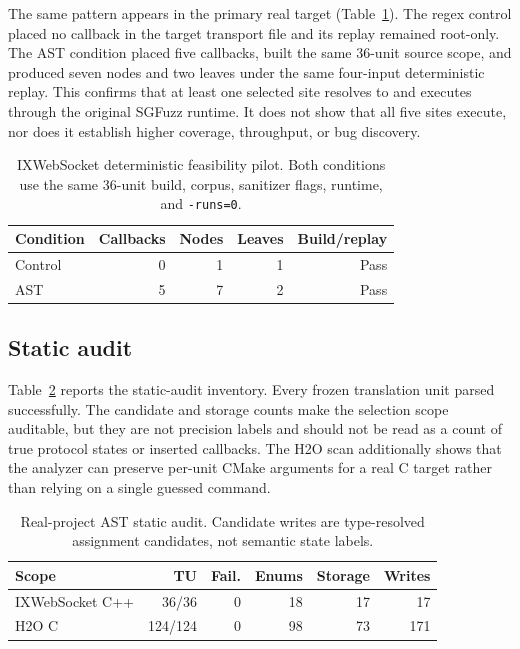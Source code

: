 \documentclass[conference]{IEEEtran}
\begin{document}
The same pattern appears in the primary real target (Table~\ref{tab:ix}).
The regex control placed no callback in the target transport file and its
replay remained root-only. The AST condition placed five callbacks, built the
same 36-unit source scope, and produced seven nodes and two leaves under the
same four-input deterministic replay. This confirms that at least one selected
site resolves to and executes through the original SGFuzz runtime. It does not
show that all five sites execute, nor does it establish higher coverage,
throughput, or bug discovery.

\begin{table}[t]
\centering
\caption{IXWebSocket deterministic feasibility pilot. Both conditions use the
same 36-unit build, corpus, sanitizer flags, runtime, and \texttt{-runs=0}.}
\label{tab:ix}
\footnotesize
\begin{tabular}{@{}lrrrr@{}}
\toprule
\textbf{Condition} & \textbf{Callbacks} & \textbf{Nodes} & \textbf{Leaves} & \textbf{Build/replay} \\
\midrule
Control & 0 & 1 & 1 & Pass \\
AST & 5 & 7 & 2 & Pass \\
\bottomrule
\end{tabular}
\end{table}

\subsection{Static audit}

Table~\ref{tab:audit} reports the static-audit inventory. Every frozen
translation unit parsed successfully. The candidate and storage counts make
the selection scope auditable, but they are not precision labels and should
not be read as a count of true protocol states or inserted callbacks. The H2O
scan additionally shows that the analyzer can preserve per-unit CMake
arguments for a real C target rather than relying on a single guessed command.

\begin{table}[t]
\centering
\caption{Real-project AST static audit. Candidate writes are type-resolved
assignment candidates, not semantic state labels.}
\label{tab:audit}
\footnotesize
\setlength{\tabcolsep}{2.3pt}
\begin{tabular}{@{}lrrrrr@{}}
\toprule
\textbf{Scope} & \textbf{TU} & \textbf{Fail.} & \textbf{Enums} & \textbf{Storage} & \textbf{Writes} \\
\midrule
IXWebSocket C++ & 36/36 & 0 & 18 & 17 & 17 \\
H2O C & 124/124 & 0 & 98 & 73 & 171 \\
\bottomrule
\end{tabular}
\end{table}
\end{document}
